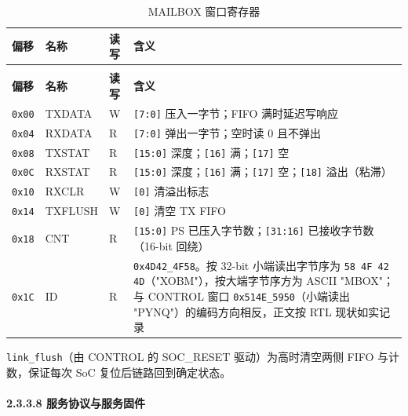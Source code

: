 {\small
\renewcommand{\thetable}{2-12}
\begin{longtable}{@{}>{\raggedright\arraybackslash}p{}>{\raggedright\arraybackslash}p{}>{\raggedright\arraybackslash}p{}>{\raggedright\arraybackslash}p{}@{}}
\caption{MAILBOX 窗口寄存器}\label{tab:2-12}\\
\toprule
\textbf{偏移} & \textbf{名称} & \textbf{读写} & \textbf{含义} \\
\midrule
\endfirsthead
\multicolumn{4}{@{}l}{\footnotesize 续表 2-12}\\
\toprule
\textbf{偏移} & \textbf{名称} & \textbf{读写} & \textbf{含义} \\
\midrule
\endhead
\texttt{0x00} & TXDATA & W & \texttt{[7:0]} 压入一字节；FIFO 满时延迟写响应 \\
\texttt{0x04} & RXDATA & R & \texttt{[7:0]} 弹出一字节；空时读 0 且不弹出 \\
\texttt{0x08} & TXSTAT & R & \texttt{[15:0]} 深度；\texttt{[16]} 满；\texttt{[17]} 空 \\
\texttt{0x0C} & RXSTAT & R & \texttt{[15:0]} 深度；\texttt{[16]} 满；\texttt{[17]} 空；\texttt{[18]} 溢出（粘滞） \\
\texttt{0x10} & RXCLR & W & \texttt{[0]} 清溢出标志 \\
\texttt{0x14} & TXFLUSH & W & \texttt{[0]} 清空 TX FIFO \\
\texttt{0x18} & CNT & R & \texttt{[15:0]} PS 已压入字节数；\texttt{[31:16]} 已接收字节数（16-bit 回绕） \\
\texttt{0x1C} & ID & R & \texttt{0x4D42\_\allowbreak{}\allowbreak{}4F58}。按 32-bit 小端读出字节序为 \texttt{58 4F 42 4D}（"XOBM"），按大端字节序方为 ASCII "MBOX"；与 CONTROL 窗口 \texttt{0x514E\_\allowbreak{}\allowbreak{}5950}（小端读出 "PYNQ"）的编码方向相反，正文按 RTL 现状如实记录 \\
\bottomrule
\end{longtable}
}

\texttt{link\_\allowbreak{}flush}（由 CONTROL 的 SOC\_RESET 驱动）为高时清空两侧 FIFO 与计数，保证每次 SoC 复位后链路回到确定状态。

\Needspace{85pt}

\paragraph{2.3.3.8 服务协议与服务固件}


